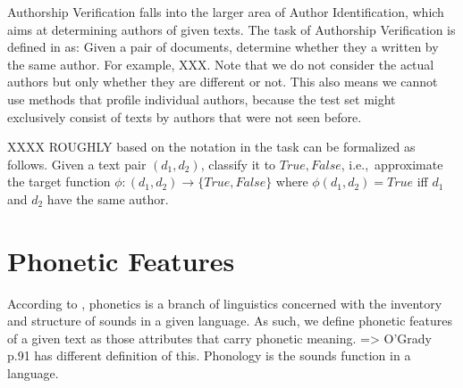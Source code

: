 Authorship Verification falls into the larger area of Author Identification, which aims at determining authors of given texts.
The task of Authorship Verification is defined in \cite{bevendorff2020shared} as: Given a pair of documents, determine whether they a written by the same author.
For example, XXX. Note that we do not consider the actual authors but only whether they are different or not.
This also means we cannot use methods that profile individual authors, because the test set might exclusively consist of texts by authors that were not seen before. %


XXXX ROUGHLY based on the notation in \cite{bevendorff2020shared} the task can be formalized as follows.
Given a text pair $(d_1, d_2)$, classify it to ${True, False}$, i.e.,\ approximate the target function $\phi{}:(d_1, d_2)\to\{True, False\}$ where $\phi(d_1, d_2)=True$ iff $d_1$ and $d_2$ have the same author.

\section{Phonetic Features}
According to \cite{ogrady2017introToLinguistics}, phonetics is a branch of linguistics concerned with the inventory and structure of sounds in a given language.
As such, we define phonetic features of a given text as those attributes that carry phonetic meaning.
=> O'Grady p.91 has different definition of this.
Phonology is the sounds function in a language.

